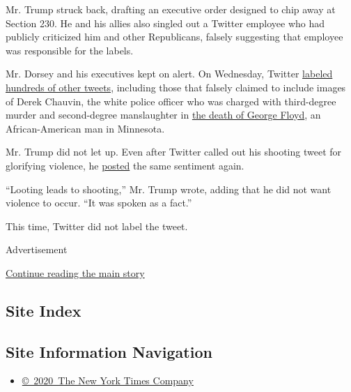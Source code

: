 Mr. Trump struck back, drafting an executive order designed to chip away
at Section 230. He and his allies also singled out a Twitter employee
who had publicly criticized him and other Republicans, falsely
suggesting that employee was responsible for the labels.

Mr. Dorsey and his executives kept on alert. On Wednesday, Twitter
\href{https://www.nytimes3xbfgragh.onion/2020/05/28/technology/trump-twitter-fact-check.html}{labeled
hundreds of other tweets}, including those that falsely claimed to
include images of Derek Chauvin, the white police officer who was
charged with third-degree murder and second-degree manslaughter in
\href{https://www.nytimes3xbfgragh.onion/2020/05/27/us/george-floyd-minneapolis-death.html}{the
death of George Floyd}, an African-American man in Minnesota.

Mr. Trump did not let up. Even after Twitter called out his shooting
tweet for glorifying violence, he
\href{https://twitter.com/realDonaldTrump/status/1266434153932894208}{posted}
the same sentiment again.

``Looting leads to shooting,'' Mr. Trump wrote, adding that he did not
want violence to occur. ``It was spoken as a fact.''

This time, Twitter did not label the tweet.

Advertisement

\protect\hyperlink{after-bottom}{Continue reading the main story}

\hypertarget{site-index}{%
\subsection{Site Index}\label{site-index}}

\hypertarget{site-information-navigation}{%
\subsection{Site Information
Navigation}\label{site-information-navigation}}

\begin{itemize}
\tightlist
\item
  \href{https://help.nytimes3xbfgragh.onion/hc/en-us/articles/115014792127-Copyright-notice}{©~2020~The
  New York Times Company}
\end{itemize}

